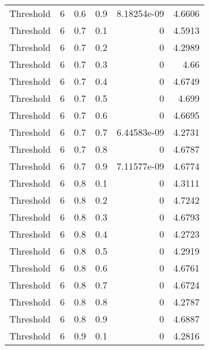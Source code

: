 \documentclass{article}
\begin{document}
\begin{longtable}[H]{lrrrrr}
 Threshold      &       6 &   0.6 &            0.9 &      8.18254e-09 &          4.6606 \\
 Threshold      &       6 &   0.7 &            0.1 &      0           &          4.5913 \\
 Threshold      &       6 &   0.7 &            0.2 &      0           &          4.2989 \\
 Threshold      &       6 &   0.7 &            0.3 &      0           &          4.66   \\
 Threshold      &       6 &   0.7 &            0.4 &      0           &          4.6749 \\
 Threshold      &       6 &   0.7 &            0.5 &      0           &          4.699  \\
 Threshold      &       6 &   0.7 &            0.6 &      0           &          4.6695 \\
 Threshold      &       6 &   0.7 &            0.7 &      6.44583e-09 &          4.2731 \\
 Threshold      &       6 &   0.7 &            0.8 &      0           &          4.6787 \\
 Threshold      &       6 &   0.7 &            0.9 &      7.11577e-09 &          4.6774 \\
 Threshold      &       6 &   0.8 &            0.1 &      0           &          4.3111 \\
 Threshold      &       6 &   0.8 &            0.2 &      0           &          4.7242 \\
 Threshold      &       6 &   0.8 &            0.3 &      0           &          4.6793 \\
 Threshold      &       6 &   0.8 &            0.4 &      0           &          4.2723 \\
 Threshold      &       6 &   0.8 &            0.5 &      0           &          4.2919 \\
 Threshold      &       6 &   0.8 &            0.6 &      0           &          4.6761 \\
 Threshold      &       6 &   0.8 &            0.7 &      0           &          4.6724 \\
 Threshold      &       6 &   0.8 &            0.8 &      0           &          4.2787 \\
 Threshold      &       6 &   0.8 &            0.9 &      0           &          4.6887 \\
 Threshold      &       6 &   0.9 &            0.1 &      0           &          4.2816 \\

\end{longtable}
\end{document}
